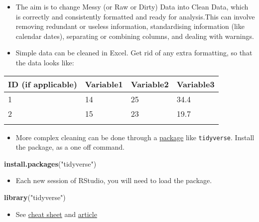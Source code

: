 \documentclass[]{article}
\newenvironment{Shaded}{\begin{snugshade}}{\end{snugshade}}
\newcommand{\KeywordTok}[1]{\textcolor[rgb]{0.13,0.29,0.53}{\textbf{#1}}}
\newcommand{\NormalTok}[1]{#1}
\newcommand{\StringTok}[1]{\textcolor[rgb]{0.31,0.60,0.02}{#1}}
\providecommand{\tightlist}{%
  \setlength{\itemsep}{0pt}\setlength{\parskip}{0pt}}
\begin{document}
\begin{itemize}
\item
  The aim is to change Messy (or Raw or Dirty) Data into Clean Data, which is correctly and consistently formatted and ready for analysis.This can involve removing redundant or useless information, standardising information (like calendar dates), separating or combining columns, and dealing with warnings.
\item
  Simple data can be cleaned in Excel. Get rid of any extra formatting, so that the data looks like:
\end{itemize}

\begin{longtable}[]{@{}llll@{}}
\toprule
ID (if applicable) & Variable1 & Variable2 & Variable3\tabularnewline
\midrule
\endhead
1 & 14 & 25 & 34.4\tabularnewline
2 & 15 & 23 & 19.7\tabularnewline
& & &\tabularnewline
\bottomrule
\end{longtable}

\begin{itemize}
\tightlist
\item
  More complex cleaning can be done through a \href{http://tidyverse.org/}{package} like \texttt{tidyverse}. Install the package, as a one off command.
\end{itemize}

\begin{Shaded}
\begin{Highlighting}[]
\KeywordTok{install.packages}\NormalTok{(}\StringTok{"tidyverse"}\NormalTok{)}
\end{Highlighting}
\end{Shaded}

\begin{itemize}
\tightlist
\item
  Each new session of RStudio, you will need to load the package.
\end{itemize}

\begin{Shaded}
\begin{Highlighting}[]
\KeywordTok{library}\NormalTok{(}\StringTok{"tidyverse"}\NormalTok{)}
\end{Highlighting}
\end{Shaded}

\begin{itemize}
\tightlist
\item
  See \href{https://www.rstudio.com/wp-content/uploads/2015/02/data-wrangling-cheatsheet.pdf}{cheat sheet} and \href{https://cran.r-project.org/doc/contrib/de_Jonge+van_der_Loo-Introduction_to_data_cleaning_with_R.pdf}{article}
\end{itemize}
\end{document}
